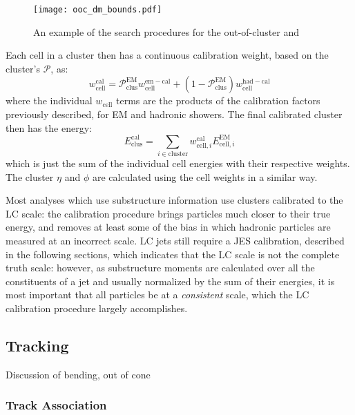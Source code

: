 
\begin{figure}
\centering
\texttt{[image: ooc\_dm\_bounds.pdf]}
\label{fig:jet-reconstruction:cluster-calibration:ooc-dm}
\caption{An example of the search procedures for the out-of-cluster and }
\end{figure}



Each cell in a cluster then has a continuous calibration weight, based on the cluster's $\mathcal{P}$, as:
%
\begin{equation}
w_\mathrm{cell}^\mathrm{cal} = \mathcal{P}^\mathrm{EM}_\mathrm{clus} w_\mathrm{cell}^\mathrm{em-cal} + (1 - \mathcal{P}_\mathrm{clus}^\mathrm{EM}) w_\mathrm{cell}^\mathrm{had-cal}
\end{equation}
%
where the individual $w_\mathrm{cell}$ terms are the products of the calibration factors previously described, for EM and hadronic showers. The final calibrated cluster then has the energy:
%
\begin{equation}
E^\mathrm{cal}_\mathrm{clus} = \sum_{i \in \mathrm{cluster}} w_{\mathrm{cell},i}^\mathrm{cal} E_{\mathrm{cell},i}^\mathrm{EM}
\end{equation}
%
which is just the sum of the individual cell energies with their respective weights. The cluster $\eta$ and $\phi$ are calculated using the cell weights in a similar way.

Most analyses which use substructure information use clusters calibrated to the LC scale: the calibration procedure brings particles much closer to their true energy, and removes at least some of the bias in which hadronic particles are measured at an incorrect scale. LC jets still require a JES calibration, described in the following sections, which indicates that the LC scale is not the complete truth scale: however, as substructure moments are calculated over all the constituents of a jet and usually normalized by the sum of their energies, it is most important that all particles be at a \textit{consistent} scale, which the LC calibration procedure largely accomplishes.

\subsection{Tracking}

Discussion of bending, out of cone

\subsubsection{Track Association}

